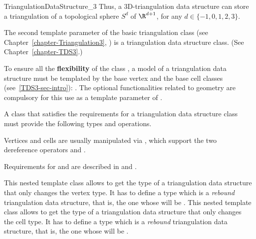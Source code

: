 \begin{ccRefConcept}{TriangulationDataStructure_3}
Thus, a 3D-triangulation data structure can store a triangulation of a
topological sphere $S^d$ of $\R^{d+1}$, for any $d \in \{-1,0,1,2,3\}$. 

\bigskip

The second template parameter of the basic triangulation class
(see Chapter~\ref{chapter-Triangulation3},
)
 is a triangulation data structure class. (See
Chapter~\ref{chapter-TDS3}.)  

To ensure all the \textbf{flexibility} of the class , a
model of a triangulation data structure must be templated by the base vertex
and the base cell classes (see~\ref{TDS3-sec-intro}):
.
The optional functionalities related to geometry are compulsory for
this use as a template parameter of .

\bigskip

A class that satisfies the requirements for a triangulation data structure
class must provide the following types and operations. 

\ccTypes
{}
\ccThreeToTwo

\ccGlue
{}

\ccGlue
{}

Vertices and cells are usually manipulated via , which support
the two dereference operators  and .

\ccGlue
{}

Requirements for  and  are described in
 and
 .

\begin{ccAdvanced}
{This nested template class allows to get the type of a triangulation
data structure that only changes the vertex type.  It has to define a type
 which is a {\it rebound} triangulation data structure, that is, the
one whose  will be .}
\ccGlue
{}
{This nested template class allows to get the type of a triangulation
data structure that only changes the cell type.  It has to define a type
 which is a {\it rebound} triangulation data structure, that is, the
one whose  will be .}
\end{ccAdvanced}



\end{ccRefConcept}
